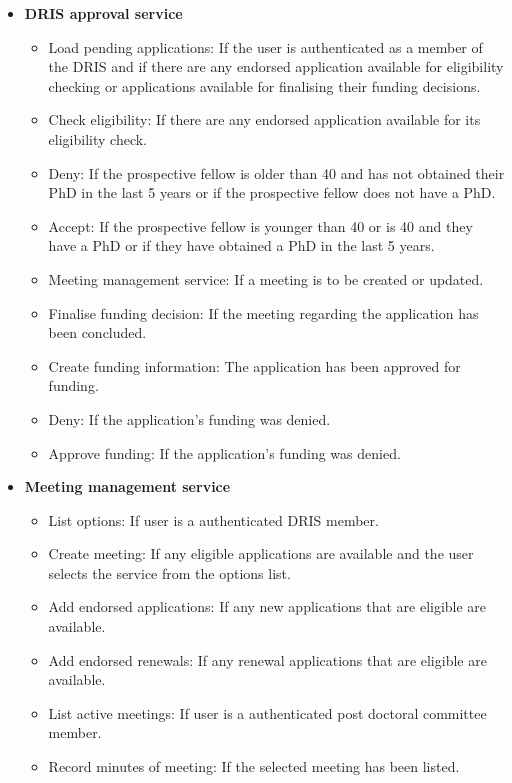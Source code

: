 \documentclass[12pt]{article}
\begin{document}
\begin{itemize}
	\item \textbf{DRIS approval service}
		\begin{itemize}
			\item Load pending applications: If the user is authenticated as a member of the DRIS and if there are any endorsed application available for eligibility checking or applications available for finalising their funding decisions.
			\item Check eligibility: If there are any endorsed application available for its eligibility check.
			\item Deny: If the prospective fellow is older than 40 and has not obtained their PhD in the last 5 years or if the prospective fellow does not have a PhD.
			\item Accept: If the prospective fellow is younger than 40 or is 40 and they have a PhD or if they have obtained a PhD in the last 5 years.
			\item Meeting management service: If a meeting is to be created or updated. 
			\item Finalise funding decision: If the meeting regarding the application has been concluded.
			\item Create funding information: The application has been approved for funding.	
			\item Deny: If the application's funding was denied.			
			\item Approve funding: If the application's funding was denied.									
		\end{itemize}
	
	\item \textbf{Meeting management service}
		\begin{itemize}
			\item List options: If user is a authenticated DRIS member.
			\item Create meeting: If any eligible applications are available and the user selects the service from the options list.
			\item Add endorsed applications: If any new applications that are eligible are available.
			\item Add endorsed renewals: If any renewal applications that are eligible are available.
			\item List active meetings: If user is a authenticated post doctoral committee member.
			\item Record minutes of meeting: If the selected meeting has been listed.							
		\end{itemize}
	\end{itemize}
\end{document}
